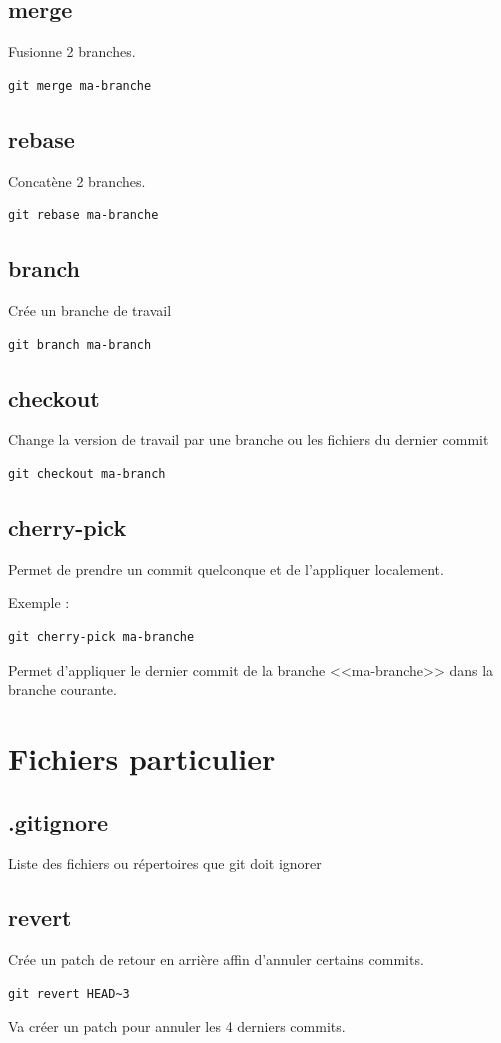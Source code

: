 \documentclass[a4paper]{article}
\begin{document}
\subsection*{merge}
Fusionne 2 branches.
\begin{verbatim}
git merge ma-branche
\end{verbatim}

\subsection*{rebase}
Concatène 2 branches.
\begin{verbatim}
git rebase ma-branche
\end{verbatim}

\subsection*{branch}
Crée un branche de travail
\begin{verbatim}
git branch ma-branch
\end{verbatim}

\subsection*{checkout}
Change la version de travail par une branche ou les fichiers du dernier commit
\begin{verbatim}
git checkout ma-branch
\end{verbatim}

\subsection*{cherry-pick}
Permet de prendre un commit quelconque et de l'appliquer localement.

Exemple : 
\begin{verbatim}
git cherry-pick ma-branche
\end{verbatim}
Permet d'appliquer le dernier commit de la branche <<ma-branche>> dans la branche courante.

\section{Fichiers particulier}

\subsection*{.gitignore}
Liste des fichiers ou répertoires que git doit ignorer

\subsection*{revert}
Crée un patch de retour en arrière affin d'annuler certains commits.

\begin{verbatim}
git revert HEAD~3
\end{verbatim}
Va créer un patch pour annuler les 4 derniers commits.
\end{document}
